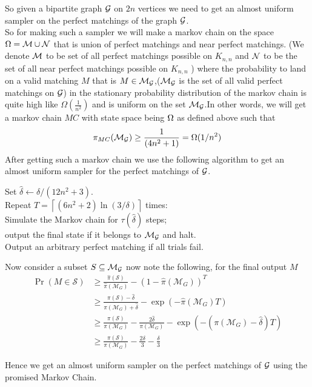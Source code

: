 \begin{flushleft}
	So given a bipartite graph $\mathcal{G}$ on $2n$ vertices we need to get an almost uniform sampler on the perfect matchings of the graph $\mathcal{G}$.\\
	So for making such a sampler we will make a markov chain on the space $\Omega = \mathcal{M} \cup \mathcal{N} $ that is union of perfect matchings and near perfect matchings. (We denote $\mathcal{M}$ to be set of all perfect matchings possible on $K_{n,n}$ and $\mathcal{N}$ to be the set of all near perfect matchings possible on $K_{n,n}$ ) where the probability to land on a valid matching $M$ that is $M\in \mathcal{M}_{\mathcal{G}}$,($\mathcal{M}_{\mathcal{G}}$ is the set of all valid perfect matchings on $\mathcal{G}$) in the stationary probability distribution of the markov chain is quite high like $\Omega(\frac{1}{n^2})$ and is uniform on the set $\mathcal{M}_{\mathcal{G}}$.In other words, we will get a markov chain $MC$ with state space being $\Omega$ as defined above such that
	$$\pi_{MC}(\mathcal{M}_{\mathcal{G}} )\geq \frac{1}{(4n^2+1)} = \Omega(1/n^2)$$
	   After getting such a markov chain we use the following algorithm to get an almost uniform sampler for the perfect matchings of $\mathcal{G}$.
\end{flushleft}
\begin{flushleft}
	Set $\hat{\delta} \leftarrow \delta /\left(12 n^2+3\right)$.\\
	Repeat $T=\left\lceil\left(6 n^2+2\right) \ln (3 / \delta)\right\rceil$ times:\\
	\parinn Simulate the Markov chain for $\tau(\hat{\delta})$ steps;\\ output the final state if it belongs to $\mathcal{M_{\mathcal{G}}}$ and halt.\\ \parinf Output an arbitrary perfect matching if all trials fail.
\end{flushleft}
\begin{flushleft}
	Now consider a subset $S\subseteq \mathcal{M}_{\mathcal{G}}$ now note the following, for the final output $M$ 
	\begin{align*}
		\operatorname{Pr}(M \in \mathcal{S}) & \geq \frac{\hat{\pi}(\mathcal{S})}{\hat{\pi}(\mathcal{M}_G)}-(1-\hat{\pi}(\mathcal{M}_G))^T \\
		& \geq \frac{\pi(\mathcal{S})-\hat{\delta}}{\pi(\mathcal{M}_G)+\hat{\delta}}-\exp (-\hat{\pi}(\mathcal{M}_G) T) \\
		& \geq \frac{\pi(\mathcal{S})}{\pi(\mathcal{M}_G)}-\frac{2 \hat{\delta}}{\pi(\mathcal{M}_G)}-\exp (-(\pi(\mathcal{M}_G)-\hat{\delta}) T) \\
		& \geq \frac{\pi(\mathcal{S})}{\pi(\mathcal{M}_G)}-\frac{2 \delta}{3}-\frac{\delta}{3}
	\end{align*}
\end{flushleft}
Hence we get an almost uniform sampler on the perfect matchings of $\mathcal{G}$ using the promised Markov Chain.
